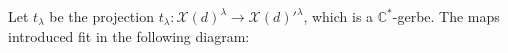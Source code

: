 \documentclass [11pt,oneside,a4paper,mathscr]{amsart}
\theoremstyle{definition}
\renewcommand{\geq}{\geqslant}
\newcommand{\X}{\mathscr{X}}
\begin{document}
Let $t_{\lambda}$ be the projection $t_\lambda\colon \X(d)^\lambda\to \X(d)'^\lambda$, 
which is a $\mathbb{C}^{\ast}$-gerbe. The maps introduced fit in the following diagram:
\end{document}
